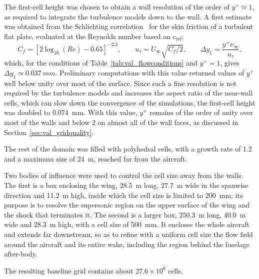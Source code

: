 The first-cell height was chosen to obtain a wall resolution of the order of $y^+ \simeq 1$, as required to integrate the turbulence models down to the wall. A first estimate was obtained from the Schlichting correlation~\cite{schlichting1979} for the skin friction of a turbulent flat plate, evaluated at the Reynolds number based on $c_\mathrm{ref}$:
\begin{equation}
  C_f = \left[ 2 \log_{10}(Re) - 0.65 \right]^{-2.3}, \qquad
  u_\tau = U_\infty \sqrt{C_f/2}, \qquad
  \Delta y_1 = \frac{y^+ \nu_\infty}{u_\tau},
  \label{eq:val_firstcell}
\end{equation}
which, for the conditions of Table~\ref{tab:val_flowconditions} and $y^+ = 1$, gives $\Delta y_1 \simeq \SI{0.037}{mm}$. Preliminary computations with this value returned values of $y^+$ well below unity over most of the surface. Since such a fine resolution is not required by the turbulence models and increases the aspect ratio of the near-wall cells, which can slow down the convergence of the simulations, the first-cell height was doubled to \SI{0.074}{mm}. With this value, $y^+$ remains of the order of unity over most of the walls and below 2 on almost all of the wall faces, as discussed in Section~\ref{sec:val_gridquality}.

The rest of the domain was filled with polyhedral cells, with a growth rate of 1.2 and a maximum size of \SI{24}{m}, reached far from the aircraft.

Two bodies of influence were used to control the cell size away from the walls. The first is a box enclosing the wing, \SI{28.5}{m} long, \SI{27.7}{m} wide in the spanwise direction and \SI{11.2}{m} high, inside which the cell size is limited to \SI{200}{mm}; its purpose is to resolve the supersonic region on the upper surface of the wing and the shock that terminates it. The second is a larger box, \SI{250.3}{m} long, \SI{40.0}{m} wide and \SI{28.3}{m} high, with a cell size of \SI{500}{mm}. It encloses the whole aircraft and extends far downstream, so as to refine with a uniform cell size the flow field around the aircraft and its entire wake, including the region behind the fuselage after-body.


The resulting baseline grid contains about $27.6 \times 10^{6}$ cells.

